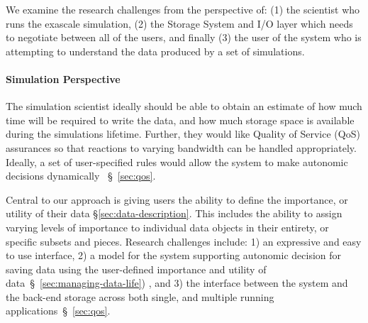 We  examine the research challenges from the perspective of:
%
(1) the scientist who runs the exascale simulation,
%
(2) the Storage System and I/O layer which needs to negotiate between all of
the users, and finally
%
(3) the user of the system who is attempting to understand the data
produced by a set of simulations.

\paragraph{Simulation Perspective}
\label{subsec:sim-perspective}
The simulation scientist ideally should be able to
obtain an estimate of how much time will be required to write the data,
and how much storage space is available during the simulations lifetime.
Further, they would like Quality of Service (QoS) assurances so that reactions
to varying bandwidth can be handled appropriately. Ideally, a set of
user-specified rules would allow the system to make autonomic decisions dynamically
~\S~\ref{sec:qos}.
%

Central to our approach is giving users the ability to define the importance, or utility of their data    
 \S\ref{sec:data-description}.
This includes the ability to assign varying levels of importance to individual data objects in their entirety, or specific
subsets and pieces.
Research challenges include: 1) an expressive and easy to use interface, 2) a model for the system supporting
autonomic decision for saving data using the user-defined importance and utility of data~\S~\ref{sec:managing-data-life})
, and 3) the interface between
the system and the back-end storage across both single, and multiple running applications~\S~\ref{sec:qos}.

